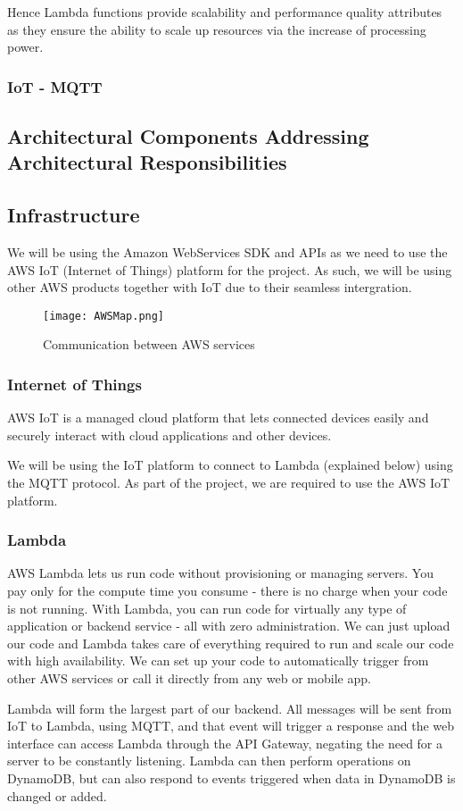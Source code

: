 \documentclass{article}
\begin{document}
		Hence Lambda functions provide scalability and performance quality attributes as they ensure the ability to scale up resources via the increase of processing power.
	\subsubsection{IoT - MQTT}
	
\subsection{Architectural Components Addressing Architectural Responsibilities}
\subsection{Infrastructure}
	We will be using the Amazon WebServices SDK and APIs as we need to use the AWS IoT (Internet of Things) platform for the project. As such, we will be using other AWS products together with IoT due to their seamless intergration.
		\begin{figure}[H]
			\centering
			\texttt{[image: AWSMap.png]}
			\caption{Communication between AWS services}
		\end{figure}
	\subsubsection{Internet of Things}
		AWS IoT is a managed cloud platform that lets connected devices easily and securely interact with cloud applications and other devices.
		
		We will be using the IoT platform to connect to Lambda (explained below) using the MQTT protocol. As part of the project, we are required to use the AWS IoT platform.
	\subsubsection{Lambda}
		AWS Lambda lets us run code without provisioning or managing servers. You pay only for the compute time you consume - there is no charge when your code is not running. With Lambda, you can run code for virtually any type of application or backend service - all with zero administration. We can just upload our code and Lambda takes care of everything required to run and scale our code with high availability. We can set up your code to automatically trigger from other AWS services or call it directly from any web or mobile app.
		
		Lambda will form the largest part of our backend. All messages will be sent from IoT to Lambda, using MQTT, and that event will trigger a response and the web interface can access Lambda through the API Gateway, negating the need for a server to be constantly listening. Lambda can then perform operations on DynamoDB, but can also respond to events triggered when data in DynamoDB is changed or added. 
\end{document}
